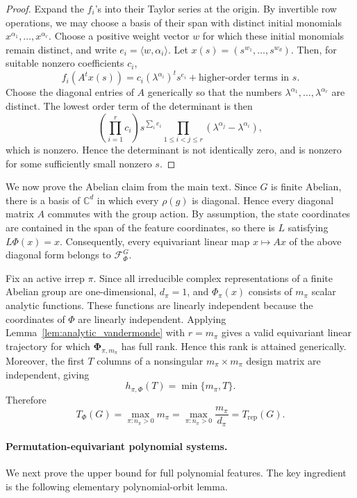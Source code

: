 \documentclass[11pt]{article}
\theoremstyle{plain}
\theoremstyle{definition}
\theoremstyle{remark}
\begin{document}
\begin{proof}
Expand the \(f_i\)'s into their Taylor series at the origin. By invertible row
operations, we may choose a basis of their span with distinct initial
monomials \(x^{\alpha_1},\ldots,x^{\alpha_r}\). Choose a positive weight
vector \(w\) for which these initial monomials remain distinct, and write
\(e_i=\langle w,\alpha_i\rangle\). Let
\(x(s)=(s^{w_1},\ldots,s^{w_d})\). Then, for suitable nonzero coefficients
\(c_i\),
\[
f_i(A^t x(s))
=
c_i(\lambda^{\alpha_i})^t s^{e_i}
+\text{higher-order terms in }s.
\]
Choose the diagonal entries of \(A\) generically so that the numbers
\(\lambda^{\alpha_1},\ldots,\lambda^{\alpha_r}\) are distinct. The lowest
order term of the determinant is then
\[
\left(\prod_{i=1}^r c_i\right)
s^{\sum_i e_i}
\prod_{1\le i<j\le r}
(\lambda^{\alpha_j}-\lambda^{\alpha_i}),
\]
which is nonzero. Hence the determinant is not identically zero, and is
nonzero for some sufficiently small nonzero \(s\).
\end{proof}

We now prove the Abelian claim from the main text. Since \(G\) is finite
Abelian, there is a basis of \(\mathbb C^d\) in which every \(\rho(g)\) is
diagonal. Hence every diagonal matrix \(A\) commutes with the group action.
By assumption, the state coordinates are contained in the span of the feature
coordinates, so there is \(L\) satisfying \(L\Phi(x)=x\). Consequently, every
equivariant linear map \(x\mapsto Ax\) of the above diagonal form belongs to
\(\mathcal F_\Phi^G\).

Fix an active irrep \(\pi\). Since all irreducible complex representations of
a finite Abelian group are one-dimensional, \(d_\pi=1\), and
\(\Phi_\pi(x)\) consists of \(m_\pi\) scalar analytic functions. These
functions are linearly independent because the coordinates of \(\Phi\) are
linearly independent. Applying Lemma~\ref{lem:analytic_vandermonde} with
\(r=m_\pi\) gives a valid equivariant linear trajectory for which
\(\mathbf{\Phi}_{\pi,m_\pi}\) has full rank. Hence this rank is attained
generically. Moreover, the first \(T\) columns of a nonsingular
\(m_\pi\times m_\pi\) design matrix are independent, giving
\[
h_{\pi,\Phi}(T)=\min\{m_\pi,T\}.
\]
Therefore
\[
T_\Phi(G)
=
\max_{\pi:n_\pi>0}m_\pi
=
\max_{\pi:n_\pi>0}\frac{m_\pi}{d_\pi}
=
T_{\mathrm{rep}}(G).
\]


\paragraph{Permutation-equivariant polynomial systems.}
We next prove the upper bound for full polynomial features. The key ingredient
is the following elementary polynomial-orbit lemma.
\end{document}
